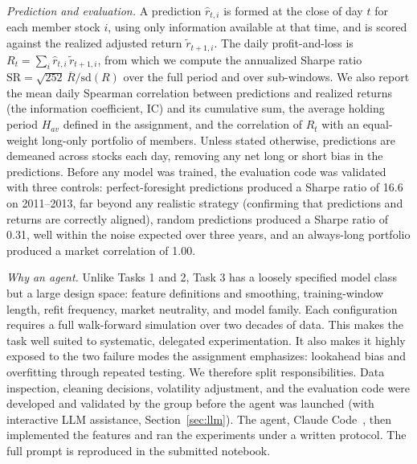 \textit{Prediction and evaluation.} A prediction $\hat r_{t,i}$ is formed at the close of day $t$ for each member stock $i$, using only information available at that time, and is scored against the realized adjusted return $\tilde r_{t+1,i}$. The daily profit-and-loss is $R_t = \sum_i \hat r_{t,i}\,\tilde r_{t+1,i}$, from which we compute the annualized Sharpe ratio $\mathrm{SR} = \sqrt{252}\,\overline{R}/\mathrm{sd}(R)$ over the full period and over sub-windows. We also report the mean daily Spearman correlation between predictions and realized returns (the information coefficient, IC) and its cumulative sum, the average holding period $H_{av}$ defined in the assignment, and the correlation of $R_t$ with an equal-weight long-only portfolio of members. Unless stated otherwise, predictions are demeaned across stocks each day, removing any net long or short bias in the predictions. Before any model was trained, the evaluation code was validated with three controls: perfect-foresight predictions produced a Sharpe ratio of 16.6 on 2011--2013, far beyond any realistic strategy (confirming that predictions and returns are correctly aligned), random predictions produced a Sharpe ratio of 0.31, well within the noise expected over three years, and an always-long portfolio produced a market correlation of 1.00.

\textit{Why an agent.} Unlike Tasks 1 and 2, Task 3 has a loosely specified model class but a large design space: feature definitions and smoothing, training-window length, refit frequency, market neutrality, and model family. Each configuration requires a full walk-forward simulation over two decades of data. This makes the task well suited to systematic, delegated experimentation. It also makes it highly exposed to the two failure modes the assignment emphasizes: lookahead bias and overfitting through repeated testing. We therefore split responsibilities. Data inspection, cleaning decisions, volatility adjustment, and the evaluation code were developed and validated by the group before the agent was launched (with interactive LLM assistance, Section~\ref{sec:llm}). The agent, Claude Code~\cite{claudecode}, then implemented the features and ran the experiments under a written protocol. The full prompt is reproduced in the submitted notebook.

